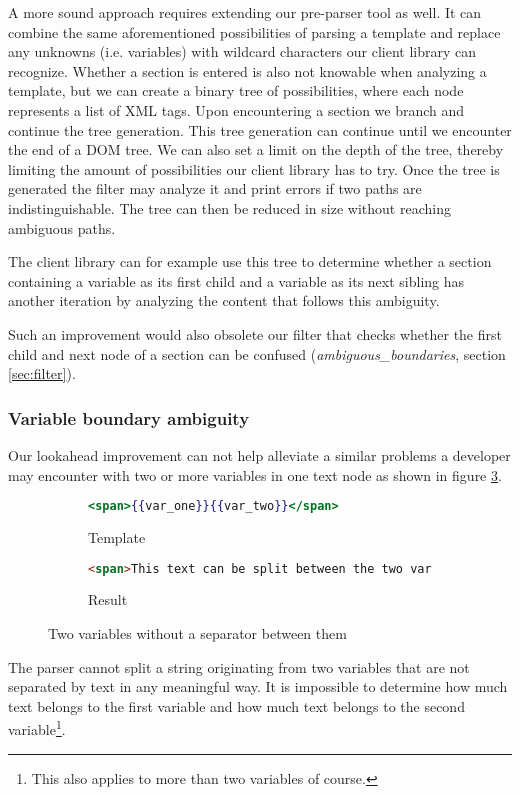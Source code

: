 \documentclass[thesis.tex]{subfiles}
\begin{document}
A more sound approach requires extending our pre-parser tool as well. It can
combine the same aforementioned possibilities of parsing a template and replace
any unknowns (i.e. variables) with wildcard characters our client library can
recognize. Whether a section is entered is also not knowable when
analyzing a template, but we can create a binary tree of possibilities,
where each node represents a list of XML tags. Upon encountering a section we
branch and continue the tree generation. This tree generation can continue until
we encounter the end of a DOM tree. We can also set a limit on the depth of the
tree, thereby limiting the amount of possibilities our client library has to
try. Once the tree is generated the filter may analyze it and print errors if
two paths are indistinguishable. The tree can then be reduced in size without
reaching ambiguous paths.

The client library can for example use this tree to determine whether a
section containing a variable as its first child and a variable as its
next sibling has another iteration by analyzing the content that follows this
ambiguity.

Such an improvement would also obsolete our filter that checks whether the
first child and next node of a section can be confused
(\emph{ambiguous\_boundaries}, section \ref{sec:filter}).

\subsubsection{Variable boundary ambiguity}
\label{sec:var-boundary-ambiguity}
Our lookahead improvement can not help alleviate a similar problems a developer
may encounter with two or more variables in one text node as shown in figure 
\ref{fig:twovars-no-sep}.
\begin{figure}
	\centering
	\begin{subfigure}{\textwidth}
		\caption{Template}
		\label{fig:twovars-no-sep.mustache}
		\begin{lstlisting}[language=mustache]
<span>{{var_one}}{{var_two}}</span>
		\end{lstlisting}
	\end{subfigure}
	
	\begin{subfigure}{\textwidth}
		\caption{Result}
		\label{fig:twovars-no-sep.html}
		\begin{lstlisting}[language=HTML]
<span>This text can be split between the two variables or belong to only one.</span>
		\end{lstlisting}
	\end{subfigure}
	\caption{Two variables without a separator between them}
	\label{fig:twovars-no-sep}
\end{figure}
The parser cannot split a string originating from two variables that are not
separated by text in any meaningful way. It is impossible to determine how much
text belongs to the first variable and how much text belongs to the second
variable\footnote{This also applies to more than two variables of course.}.
\end{document}
